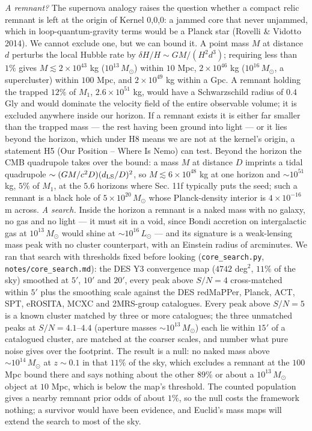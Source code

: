\documentclass[
  11pt,
]{article}
\begin{document}
\emph{A remnant?} The supernova analogy raises the question whether a
compact relic remnant is left at the origin of Kernel 0,0,0: a jammed
core that never unjammed, which in loop-quantum-gravity terms would be a
Planck star (Rovelli \& Vidotto 2014). We cannot exclude one, but we can
bound it. A point mass \(M\) at distance \(d\) perturbs the local Hubble
rate by \(\delta H/H \sim GM/(H^2 d^3)\); requiring less than \(1\%\)
gives \(M \lesssim 2\times10^{43}\) kg (\(10^{13}\,M_\odot\)) within
\(10\) Mpc, \(2\times10^{46}\) kg (\(10^{16}\,M_\odot\), a supercluster)
within \(100\) Mpc, and \(2\times10^{49}\) kg within a Gpc. A remnant
holding the trapped \(12\%\) of \(M_1\), \(2.6\times10^{51}\) kg, would
have a Schwarzschild radius of \(0.4\) Gly and would dominate the
velocity field of the entire observable volume; it is excluded anywhere
inside our horizon. If a remnant exists it is either far smaller than
the trapped mass --- the rest having been ground into light --- or it
lies beyond the horizon, which under H8 means we are not at the kernel's
origin, a statement H5 (Our Position -- Where Is Nemo) can test. Beyond
the horizon the CMB quadrupole takes over the bound: a mass \(M\) at
distance \(D\) imprints a tidal quadrupole
\(\sim (GM/c^2 D)(d_{\rm LS}/D)^2\), so \(M \lesssim 6\times10^{48}\) kg
at one horizon and \(\sim 10^{51}\) kg, \(5\%\) of \(M_1\), at the
\(5.6\) horizons where Sec. 11f typically puts the seed; such a remnant
is a black hole of \(5\times10^{20}\,M_\odot\) whose Planck-density
interior is \(4\times10^{-16}\) m across. \emph{A search.} Inside the
horizon a remnant is a naked mass with no galaxy, no gas and no light
--- it must sit in a void, since Bondi accretion on intergalactic gas at
\(10^{13}\,M_\odot\) would shine at \(\sim 10^{16}\,L_\odot\) --- and
its signature is a weak-lensing mass peak with no cluster counterpart,
with an Einstein radius of arcminutes. We ran that search with
thresholds fixed before looking (\texttt{core\_search.py},
\texttt{notes/core\_search.md}): the DES Y3 convergence map (\(4742\)
deg\(^2\), \(11\%\) of the sky) smoothed at \(5'\), \(10'\) and \(20'\),
every peak above \(S/N = 4\) cross-matched within \(5'\) plus the
smoothing scale against the DES redMaPPer, Planck, ACT, SPT, eROSITA,
MCXC and 2MRS-group catalogues. Every peak above \(S/N = 5\) is a known
cluster matched by three or more catalogues; the three unmatched peaks
at \(S/N = 4.1\)--\(4.4\) (aperture masses \(\sim 10^{13}\,M_\odot\))
each lie within \(15'\) of a catalogued cluster, are matched at the
coarser scales, and number what pure noise gives over the footprint. The
result is a null: no naked mass above \(\sim 10^{14}\,M_\odot\) at
\(z \sim 0.1\) in that \(11\%\) of the sky, which excludes a remnant at
the \(100\) Mpc bound there and says nothing about the other \(89\%\) or
about a \(10^{13}\,M_\odot\) object at \(10\) Mpc, which is below the
map's threshold. The counted population gives a nearby remnant prior
odds of about \(1\%\), so the null costs the framework nothing; a
survivor would have been evidence, and Euclid's mass maps will extend
the search to most of the sky.
\end{document}
